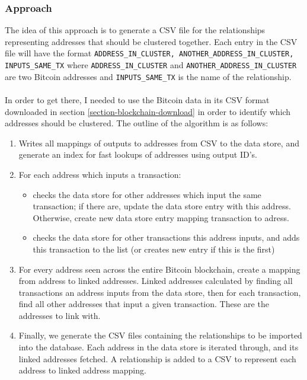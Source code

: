 \subsubsection{Approach}
The idea of this approach is to generate a CSV file for the relationships representing addresses that should be clustered together. Each entry in the CSV file will have the format \texttt{ADDRESS\_IN\_CLUSTER, ANOTHER\_ADDRESS\_IN\_CLUSTER, INPUTS\_SAME\_TX} where \texttt{ADDRESS\_IN\_CLUSTER} and \texttt{ANOTHER\_ADDRESS\_IN\_CLUSTER} are two Bitcoin addresses and \texttt{INPUTS\_SAME\_TX} is the name of the relationship. 
\\\\
In order to get there, I needed to use the Bitcoin data in its CSV format downloaded in section \ref{section-blockchain-download} in order to identify which addresses should be clustered. The outline of the algorithm is as follows:
\begin{enumerate}
    \item Writes all mappings of outputs to addresses from CSV to the data store, and generate an index for fast lookups of addresses using output ID's.
    \item For each address which inputs a transaction:
    \begin{itemize}
        \item checks the data store for other addresses which input the same transaction; if there are, update the data store entry with this address. Otherwise, create new data store entry mapping transaction to adress.
        \item checks the data store for other transactions this address inputs, and adds this transaction to the list (or creates new entry if this is the first)
    \end{itemize}
    \item For every address seen across the entire Bitcoin blockchain, create a mapping from address to linked addresses. Linked addresses calculated by finding all transactions an address inputs from the data store, then for each transaction, find all other addresses that input a given transaction. These are the addresses to link with. 
    \item Finally, we generate the CSV files containing the relationships to be imported into the database. Each address in the data store is iterated through, and its linked addresses fetched. A relationship is added to a CSV to represent each address to linked address mapping. 
\end{enumerate}

